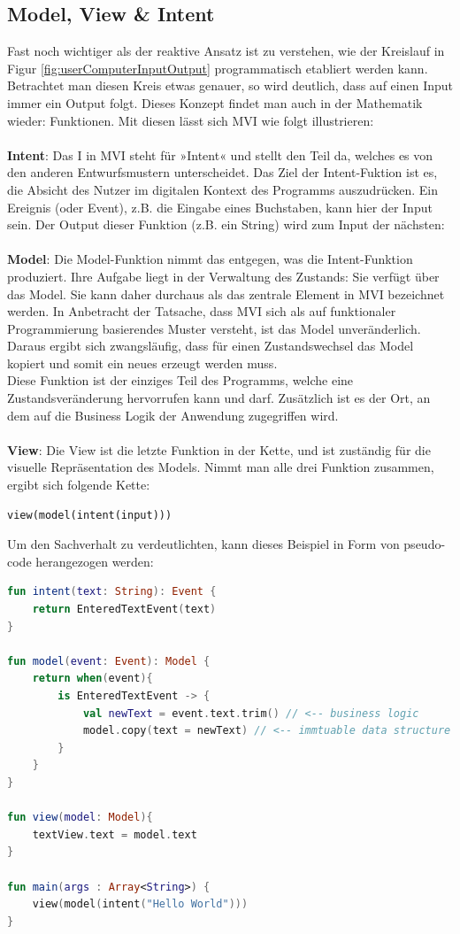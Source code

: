 \subsection{Model, View \& Intent}
Fast noch wichtiger als der reaktive Ansatz ist zu verstehen, wie der Kreislauf in Figur \ref{fig:userComputerInputOutput} 
programmatisch etabliert werden kann. Betrachtet man diesen Kreis etwas genauer, so wird deutlich, dass auf einen Input immer ein Output folgt. Dieses Konzept findet man auch in der Mathematik wieder: Funktionen. Mit diesen lässt sich MVI wie folgt illustrieren:
\\
\\
\textbf{Intent}: Das I in MVI steht für »Intent« und stellt den Teil da, welches es von den anderen Entwurfsmustern unterscheidet. Das Ziel der Intent-Fuktion ist es, die Absicht des Nutzer im digitalen Kontext des Programms auszudrücken.
Ein Ereignis (oder Event), z.B. die Eingabe eines Buchstaben, kann hier der Input sein.
Der Output dieser Funktion (z.B. ein String) wird zum Input der nächsten:
\\
\\
\textbf{Model}: Die Model-Funktion nimmt das entgegen, was die Intent-Funktion produziert. Ihre Aufgabe liegt in der Verwaltung des Zustands: Sie verfügt über das Model. Sie kann daher durchaus als das zentrale Element in MVI bezeichnet werden. In Anbetracht der Tatsache, dass MVI sich als auf funktionaler Programmierung basierendes Muster versteht, ist das Model unveränderlich. Daraus ergibt sich zwangsläufig, dass für einen Zustandswechsel das Model kopiert und somit ein neues erzeugt werden muss. 
\\
Diese Funktion ist der einziges Teil des Programms, welche eine Zustandsveränderung hervorrufen kann und darf. Zusätzlich ist es der Ort, an dem auf die Business Logik der Anwendung zugegriffen wird.
\\
\\
\textbf{View}: Die View ist die letzte Funktion in der Kette, und ist zuständig für die visuelle Repräsentation des Models.
\newpage
Nimmt man alle drei Funktion zusammen, ergibt sich folgende Kette:
\begin{lstlisting}[caption={funktion}, xleftmargin=.3\textwidth, frame=false, numbers=none]
view(model(intent(input)))
\end{lstlisting}
Um den Sachverhalt zu verdeutlichten, kann dieses Beispiel in Form von pseudo-code herangezogen werden:
\begin{lstlisting}[caption={pseudo mvi implementation}, label={lst:pseudo-mvi}, language=Kotlin]
fun intent(text: String): Event {
	return EnteredTextEvent(text)
}

fun model(event: Event): Model {
	return when(event){
		is EnteredTextEvent -> {
			val newText = event.text.trim() // <-- business logic
			model.copy(text = newText) // <-- immtuable data structure
		}
	}
}

fun view(model: Model){
	textView.text = model.text 	
}

fun main(args : Array<String>) {
	view(model(intent("Hello World")))
}
\end{lstlisting}
